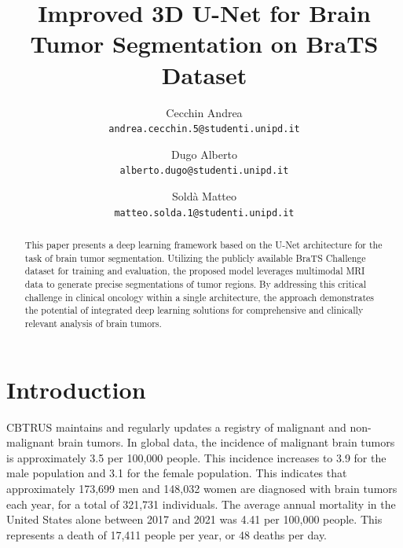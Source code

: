 \documentclass[10pt,twocolumn,letterpaper]{article}
\begin{document}
\title{Improved 3D U-Net for Brain Tumor Segmentation on BraTS Dataset}
\author{Cecchin Andrea\\
{\tt\scriptsize andrea.cecchin.5@studenti.unipd.it}\\
\and
Dugo Alberto\\
{\tt\scriptsize alberto.dugo@studenti.unipd.it}\\
\and
Soldà Matteo\\
{\tt\scriptsize matteo.solda.1@studenti.unipd.it}\\
}
\maketitle

\begin{abstract}
    This paper presents a deep learning framework based on the U-Net architecture for the task of brain tumor segmentation. Utilizing the publicly available BraTS Challenge dataset for training and evaluation, the proposed model leverages multimodal MRI data to generate precise segmentations of tumor regions. By addressing this critical challenge in clinical oncology within a single architecture, the approach demonstrates the potential of integrated deep learning solutions for comprehensive and clinically relevant analysis of brain tumors.
\end{abstract}

\section{Introduction}
CBTRUS\cite{CBTRUSTumors2022} maintains and regularly updates a registry of malignant and non-malignant brain tumors.
In global data, the incidence of malignant brain tumors is approximately 3.5 per 100,000 people. This incidence increases to 3.9 for the male population and 3.1 for the female population. This indicates that approximately 173,699 men and 148,032 women are diagnosed with brain tumors each year, for a total of 321,731 individuals. The average annual mortality in the United States alone between 2017 and 2021 was 4.41 per 100,000 people. This represents a death of 17,411 people per year, or 48 deaths per day.
\end{document}

